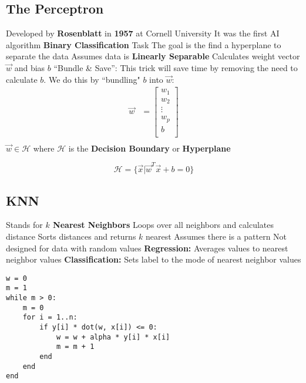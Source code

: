 \subsection{The Perceptron\cite{rosenblatt1958perceptron}}
\begin{outline}
    \1 Developed by \textbf{Rosenblatt} in \textbf{1957} at Cornell University
    \1 It was the first AI algorithm
    \1 \textbf{Binary Classification} Task
    \1 The goal is the find a hyperplane to separate the data
    \1 Assumes data is \textbf{Linearly Separable}
    \1 Calculates weight vector $\vec{w}$ and bias $b$ 
    \1 ``Bundle \& Save'': This trick will save time by removing the need to calculate $b$. We do this by ``bundling" $b$ into $\vec{w}$: 
    \begin{align*}
    \vec{w} &= \begin{bmatrix}
           w_{1}    \\
           w_{2}    \\
           \vdots   \\
           w_{p}    \\
           b        \\
         \end{bmatrix} \\
    \end{align*}
    \1 $\vec{w} \in \mathcal{H}$ where $\mathcal{H}$ is the \textbf{Decision Boundary} or \textbf{Hyperplane}
\end{outline}

\[
\mathcal{H} = \{\vec{x} | \vec{w}^T\vec{x} + b = 0\}
\]

\subsection{KNN\cite{guo2003knn}}
\begin{outline}
    \1 Stands for \textbf{$k$ Nearest Neighbors}
    \1 Loops over all neighbors and calculates distance
    \1 Sorts distances and returns $k$ nearest
    \1 Assumes there is a pattern
    \1 Not designed for data with random values
    \1 \textbf{Regression:} Averages values to nearest neighbor values
    \1 \textbf{Classification:} Sets label to the mode of nearest neighbor values
\end{outline}

\begin{verbatim}
w = 0
m = 1
while m > 0:
    m = 0
    for i = 1..n:
        if y[i] * dot(w, x[i]) <= 0:
            w = w + alpha * y[i] * x[i]
            m = m + 1
        end
    end
end
\end{verbatim}

